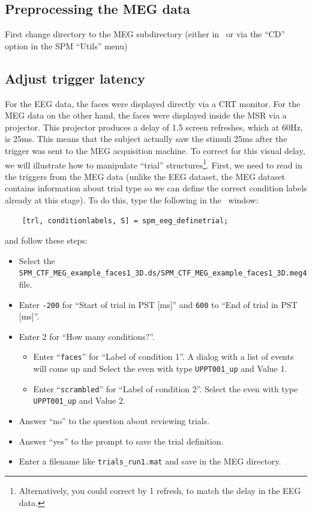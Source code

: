 \subsection{Preprocessing the MEG data}

First change directory to the MEG subdirectory (either in \matlab\, or via the ``CD'' option in the SPM ``Utils'' menu)

\subsection{Adjust trigger latency}

For the EEG data, the faces were displayed directly via a CRT monitor. For the MEG data on the other hand, the faces were displayed inside the MSR via a projector. This projector produces a delay of 1.5 screen refreshes, which at 60Hz, is 25ms. This means that the subject actually saw the stimuli 25ms after the trigger was sent to the MEG acquisition machine. To correct for this visual delay, we will illustrate how to manipulate ``trial'' structures\footnote{Alternatively, you could correct by 1 refresh, to match the delay in the EEG data.}. First, we need to read in the triggers from the MEG data (unlike the EEG dataset, the MEG dataset contains information about trial type so we can define the correct condition labels already at this stage). To do this, type the following in the \matlab\ window:

\begin{verbatim}
    [trl, conditionlabels, S] = spm_eeg_definetrial;
\end{verbatim}

and follow these steps:
\begin{itemize}
 \item Select the \texttt{SPM\_CTF\_MEG\_example\_faces1\_3D.ds/SPM\_CTF\_MEG\_example\_faces1\_3D.meg4} file.
 \item Enter \texttt{-200} for ``Start of trial in PST [ms]'' and \texttt{600} to ``End of trial in PST [ms]''.
 \item Enter 2 for ``How many conditions?''.
 \begin{itemize}
  \item Enter ``\texttt{faces}'' for ``Label of condition 1''. A dialog with a list of events will come up and Select the even with type \texttt{UPPT001\_up} and Value 1.
  \item Enter ``\texttt{scrambled}'' for ``Label of condition 2''. Select the even with type \texttt{UPPT001\_up} and Value 2.
 \end{itemize}
 \item Answer ``no'' to the question about reviewing trials.
 \item Answer ``yes'' to the prompt to save the trial definition.
 \item Enter a filename like \texttt{trials\_run1.mat} and save in the MEG directory.
\end{itemize}

